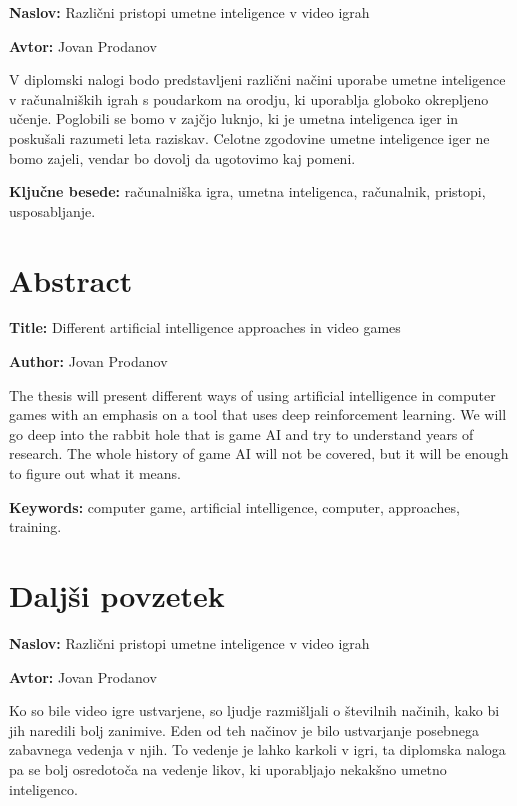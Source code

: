 \documentclass[a4paper, 12pt]{book}
\newcommand{\ttitle}{Različni pristopi umetne inteligence v video igrah}
\newcommand{\ttitleEn}{Different artificial intelligence approaches in video games}
\newcommand{\tauthor}{Jovan Prodanov}
\newcommand{\tkeywords}{računalniška igra, umetna inteligenca, računalnik, pristopi, usposabljanje}
\newcommand{\tkeywordsEn}{computer game, artificial intelligence, computer, approaches, training}
\newcommand{\clearemptydoublepage}{\newpage{\pagestyle{empty}\cleardoublepage}}
\begin{document}
\noindent\textbf{Naslov:} \ttitle
\bigskip

\noindent\textbf{Avtor:} \tauthor
\bigskip

\noindent 
V diplomski nalogi bodo predstavljeni različni načini uporabe umetne inteligence v računalniških igrah s poudarkom na orodju, ki uporablja globoko okrepljeno učenje. Poglobili se bomo v zajčjo luknjo, ki je umetna inteligenca iger in poskušali razumeti leta raziskav. Celotne zgodovine umetne inteligence iger ne bomo zajeli, vendar bo dovolj da ugotovimo kaj pomeni.
\bigskip

\noindent\textbf{Ključne besede:} \tkeywords.
\clearemptydoublepage



\chapter*{Abstract}

\noindent\textbf{Title:} \ttitleEn
\bigskip

\noindent\textbf{Author:} \tauthor
\bigskip

\noindent 
The thesis will present different ways of using artificial intelligence in computer games with an emphasis on a tool that uses deep reinforcement learning.
We will go deep into the rabbit hole that is game AI and try to understand years of research. The whole history of game AI will not be covered, but it will be enough to figure out what it means.
\bigskip



\noindent\textbf{Keywords:} \tkeywordsEn.
\clearemptydoublepage



\chapter*{Daljši povzetek}

\noindent\textbf{Naslov:} \ttitle
\bigskip

\noindent\textbf{Avtor:} \tauthor
\bigskip

Ko so bile video igre ustvarjene, so ljudje razmišljali o številnih načinih, kako bi jih naredili bolj zanimive. Eden od teh načinov je bilo ustvarjanje posebnega zabavnega vedenja v njih. To vedenje je lahko karkoli v igri, ta diplomska naloga pa se bolj osredotoča na vedenje likov, ki uporabljajo nekakšno umetno inteligenco.
\end{document}
